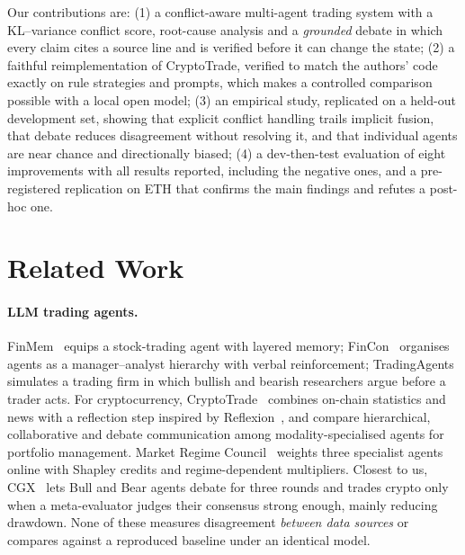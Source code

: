 \documentclass[11pt]{article}
\begin{document}
Our contributions are:
(1) a conflict-aware multi-agent trading system with a KL--variance conflict score, root-cause analysis and a
\emph{grounded} debate in which every claim cites a source line and is verified before it can change the state;
(2) a faithful reimplementation of CryptoTrade, verified to match the authors' code exactly on rule strategies and
prompts, which makes a controlled comparison possible with a local open model;
(3) an empirical study, replicated on a held-out development set, showing that explicit conflict handling trails
implicit fusion, that debate reduces disagreement without resolving it, and that individual agents are near chance and
directionally biased;
(4) a dev-then-test evaluation of eight improvements with all results reported, including the negative ones, and a
pre-registered replication on ETH that confirms the main findings and refutes a post-hoc one.

\section{Related Work}

\paragraph{LLM trading agents.}
FinMem~\citep{yu2023finmem} equips a stock-trading agent with layered memory; FinCon~\citep{yu2024fincon} organises
agents as a manager--analyst hierarchy with verbal reinforcement; TradingAgents~\citep{xiao2024tradingagents} simulates a
trading firm in which bullish and bearish researchers argue before a trader acts. For cryptocurrency,
CryptoTrade~\citep{li2024cryptotrade} combines on-chain statistics and news with a reflection step inspired by
Reflexion~\citep{shinn2023reflexion}, and \citet{luo2025cryptomas} compare hierarchical, collaborative and debate
communication among modality-specialised agents for portfolio management. Market Regime Council~\citep{mrc2026}
weights three specialist agents online with Shapley credits and regime-dependent multipliers. Closest to us,
CGX~\citep{bajgora2026cgx} lets Bull and Bear agents debate for three rounds and trades crypto only when a meta-evaluator
judges their consensus strong enough, mainly reducing drawdown. None of these measures disagreement \emph{between data
sources} or compares against a reproduced baseline under an identical model.
\end{document}
